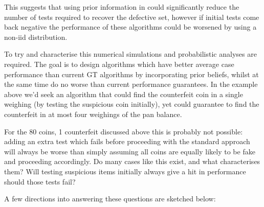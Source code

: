 \documentclass[conference]{IEEEtran}
\begin{document}
This suggests that using prior information in could significantly reduce the number of tests required to recover the defective set, however if initial tests come back negative the performance of these algorithms could be worsened by using a non-iid distribution. 

To try and characterise this numerical simulations and probabilistic analyses are required. The goal is to design algorithms which have better average case performance than current GT algorithms by incorporating prior beliefs, whilst at the same time do no worse than current performance guarantees. In the example above we'd seek an algorithm that could find the counterfeit coin in a single weighing (by testing the suspicious coin initially), yet could guarantee to find the counterfeit in at most four weighings of the pan balance. 

For the 80 coins, 1 counterfeit discussed above this is probably not possible: adding an extra test which fails before proceeding with the standard approach will always be worse than simply assuming all coins are equally likely to be fake and proceeding accordingly. Do many cases like this exist, and what characterises them? Will testing suspicious items initially always give a hit in performance should those tests fail? 

A few directions into answering these questions are sketched below:
\end{document}

